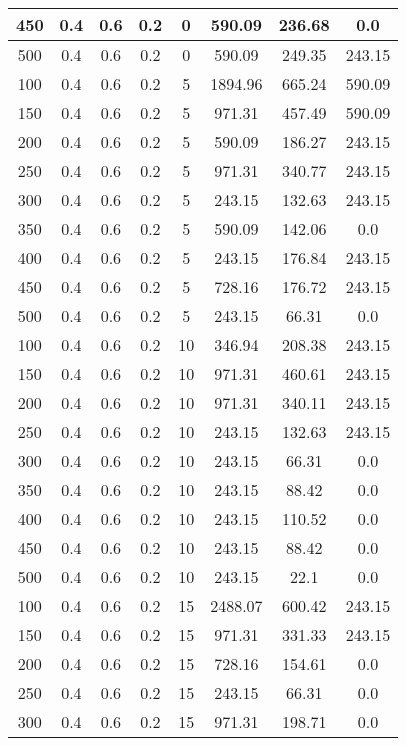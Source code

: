 \documentclass[a4paper, 12pt]{extreport}
\begin{document}
\begin{itemize}
\begin{longtable}{|c|c|c|c|c|c|c|c|}
			450 & 0.4 & 0.6 & 0.2 & 0 & 590.09 & 236.68 & 0.0 \\\hline
			500 & 0.4 & 0.6 & 0.2 & 0 & 590.09 & 249.35 & 243.15 \\\hline
			100 & 0.4 & 0.6 & 0.2 & 5 & 1894.96 & 665.24 & 590.09 \\\hline
			150 & 0.4 & 0.6 & 0.2 & 5 & 971.31 & 457.49 & 590.09 \\\hline
			200 & 0.4 & 0.6 & 0.2 & 5 & 590.09 & 186.27 & 243.15 \\\hline
			250 & 0.4 & 0.6 & 0.2 & 5 & 971.31 & 340.77 & 243.15 \\\hline
			300 & 0.4 & 0.6 & 0.2 & 5 & 243.15 & 132.63 & 243.15 \\\hline
			350 & 0.4 & 0.6 & 0.2 & 5 & 590.09 & 142.06 & 0.0 \\\hline
			400 & 0.4 & 0.6 & 0.2 & 5 & 243.15 & 176.84 & 243.15 \\\hline
			450 & 0.4 & 0.6 & 0.2 & 5 & 728.16 & 176.72 & 243.15 \\\hline
			500 & 0.4 & 0.6 & 0.2 & 5 & 243.15 & 66.31 & 0.0 \\\hline
			100 & 0.4 & 0.6 & 0.2 & 10 & 346.94 & 208.38 & 243.15 \\\hline
			150 & 0.4 & 0.6 & 0.2 & 10 & 971.31 & 460.61 & 243.15 \\\hline
			200 & 0.4 & 0.6 & 0.2 & 10 & 971.31 & 340.11 & 243.15 \\\hline
			250 & 0.4 & 0.6 & 0.2 & 10 & 243.15 & 132.63 & 243.15 \\\hline
			300 & 0.4 & 0.6 & 0.2 & 10 & 243.15 & 66.31 & 0.0 \\\hline
			350 & 0.4 & 0.6 & 0.2 & 10 & 243.15 & 88.42 & 0.0 \\\hline
			400 & 0.4 & 0.6 & 0.2 & 10 & 243.15 & 110.52 & 0.0 \\\hline
			450 & 0.4 & 0.6 & 0.2 & 10 & 243.15 & 88.42 & 0.0 \\\hline
			500 & 0.4 & 0.6 & 0.2 & 10 & 243.15 & 22.1 & 0.0 \\\hline
			100 & 0.4 & 0.6 & 0.2 & 15 & 2488.07 & 600.42 & 243.15 \\\hline
			150 & 0.4 & 0.6 & 0.2 & 15 & 971.31 & 331.33 & 243.15 \\\hline
			200 & 0.4 & 0.6 & 0.2 & 15 & 728.16 & 154.61 & 0.0 \\\hline
			250 & 0.4 & 0.6 & 0.2 & 15 & 243.15 & 66.31 & 0.0 \\\hline
			300 & 0.4 & 0.6 & 0.2 & 15 & 971.31 & 198.71 & 0.0 \\\hline

\end{longtable}
\end{itemize}
\end{document}
